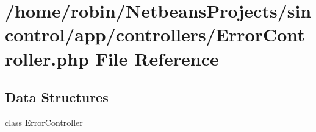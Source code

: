 \hypertarget{_error_controller_8php}{}\section{/home/robin/\+Netbeans\+Projects/sincontrol/app/controllers/\+Error\+Controller.php File Reference}
\label{_error_controller_8php}
\subsection*{Data Structures}
\begin{DoxyCompactItemize}
\item 
class \hyperlink{class_error_controller}{Error\+Controller}
\end{DoxyCompactItemize}

